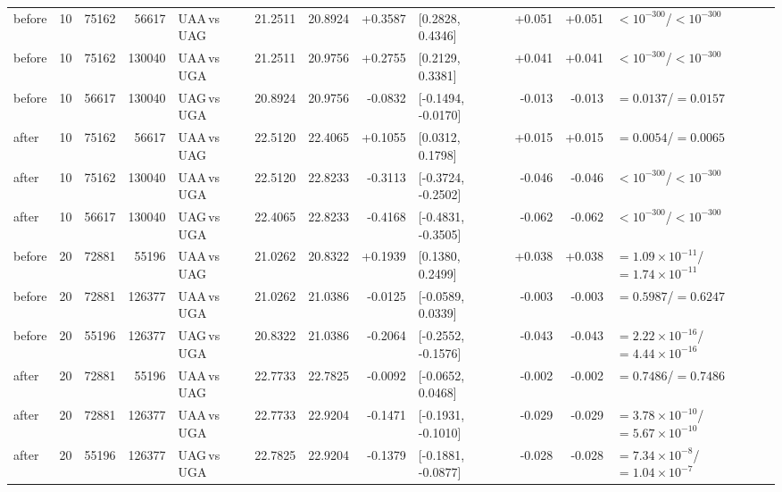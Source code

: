 \begin{center}
{\begin{tabular}{lrrrlrrrlrrl}
before & 10 & 75162 & 56617 & UAA$\,$vs$\,$UAG & 21.2511 & 20.8924 & +0.3587 & [0.2828, 0.4346] & +0.051 & +0.051 & $<10^{-300}$/$<10^{-300}$ \\
before & 10 & 75162 & 130040 & UAA$\,$vs$\,$UGA & 21.2511 & 20.9756 & +0.2755 & [0.2129, 0.3381] & +0.041 & +0.041 & $<10^{-300}$/$<10^{-300}$ \\
before & 10 & 56617 & 130040 & UAG$\,$vs$\,$UGA & 20.8924 & 20.9756 & -0.0832 & [-0.1494, -0.0170] & -0.013 & -0.013 & $=0.0137$/$=0.0157$ \\
after & 10 & 75162 & 56617 & UAA$\,$vs$\,$UAG & 22.5120 & 22.4065 & +0.1055 & [0.0312, 0.1798] & +0.015 & +0.015 & $=0.0054$/$=0.0065$ \\
after & 10 & 75162 & 130040 & UAA$\,$vs$\,$UGA & 22.5120 & 22.8233 & -0.3113 & [-0.3724, -0.2502] & -0.046 & -0.046 & $<10^{-300}$/$<10^{-300}$ \\
after & 10 & 56617 & 130040 & UAG$\,$vs$\,$UGA & 22.4065 & 22.8233 & -0.4168 & [-0.4831, -0.3505] & -0.062 & -0.062 & $<10^{-300}$/$<10^{-300}$ \\
before & 20 & 72881 & 55196 & UAA$\,$vs$\,$UAG & 21.0262 & 20.8322 & +0.1939 & [0.1380, 0.2499] & +0.038 & +0.038 & $=1.09\times 10^{-11}$/$=1.74\times 10^{-11}$ \\
before & 20 & 72881 & 126377 & UAA$\,$vs$\,$UGA & 21.0262 & 21.0386 & -0.0125 & [-0.0589, 0.0339] & -0.003 & -0.003 & $=0.5987$/$=0.6247$ \\
before & 20 & 55196 & 126377 & UAG$\,$vs$\,$UGA & 20.8322 & 21.0386 & -0.2064 & [-0.2552, -0.1576] & -0.043 & -0.043 & $=2.22\times 10^{-16}$/$=4.44\times 10^{-16}$ \\
after & 20 & 72881 & 55196 & UAA$\,$vs$\,$UAG & 22.7733 & 22.7825 & -0.0092 & [-0.0652, 0.0468] & -0.002 & -0.002 & $=0.7486$/$=0.7486$ \\
after & 20 & 72881 & 126377 & UAA$\,$vs$\,$UGA & 22.7733 & 22.9204 & -0.1471 & [-0.1931, -0.1010] & -0.029 & -0.029 & $=3.78\times 10^{-10}$/$=5.67\times 10^{-10}$ \\
after & 20 & 55196 & 126377 & UAG$\,$vs$\,$UGA & 22.7825 & 22.9204 & -0.1379 & [-0.1881, -0.0877] & -0.028 & -0.028 & $=7.34\times 10^{-8}$/$=1.04\times 10^{-7}$ \\
\bottomrule
\end{tabular}%
}
\end{center}
